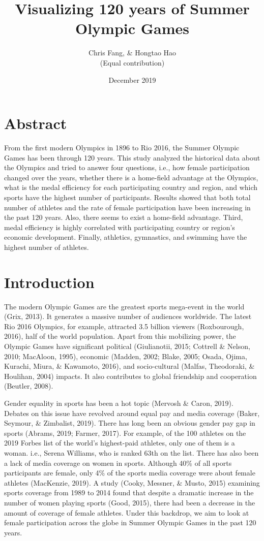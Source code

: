 \documentclass[12pt]{article}
\title{Visualizing 120 years of Summer Olympic Games}
\author{Chris Fang, \& Hongtao Hao \\ (Equal contribution)}
\date{December 2019}
\begin{document}
\section*{Abstract}
From the first modern Olympics in 1896 to Rio 2016, the Summer Olympic Games has been through 120 years. This study analyzed the historical data about the Olympics and tried to answer four questions, i.e., how female participation changed over the years, whether there is a home-field advantage at the Olympics, what is the medal efficiency for each participating country and region, and which sports have the highest number of participants. Results showed that both total number of athletes and the rate of female participation have been increasing in the past 120 years. Also, there seems to exist a home-field advantage. Third, medal efficiency is highly correlated with participating country or region's economic development. Finally, athletics, gymnastics, and swimming have the highest number of athletes.
\newpage
\tableofcontents
\maketitle

\maketitle

\section{Introduction}
\flushleft
The modern Olympic Games are the greatest sports mega-event in the world (Grix, 2013). It generates a massive number of  audiences worldwide. The latest Rio 2016 Olympics, for example, attracted 3.5 billion viewers (Roxbourough, 2016), half of the world population. Apart from this mobilizing power, the Olympic Games have significant political (Giulianotii, 2015; Cottrell \& Nelson, 2010; MacAloon, 1995), economic (Madden, 2002; Blake, 2005; Osada, Ojima, Kurachi, Miura, \& Kawamoto, 2016), and socio-cultural (Malfas, Theodoraki, \& Houlihan, 2004) impacts. It also contributes to global friendship and cooperation (Beutler, 2008). 

Gender equality in sports has been a hot topic (Mervosh \& Caron, 2019). Debates on this issue have revolved around equal pay and media coverage (Baker, Seymour, \& Zimbalist, 2019). There has long been an obvious gender pay gap in sports (Abrams, 2019; Farmer, 2017). For example, of the 100 athletes on the 2019 Forbes list of the world’s highest-paid athletes, only one of them is a woman. i.e., Serena Williams, who is ranked 63th on the list. There has also been a lack of media coverage on women in sports. Although 40\% of all sports participants are female, only 4\% of the sports media coverage were about female athletes (MacKenzie, 2019). A study (Cooky, Messner, \& Musto, 2015) examining sports coverage from 1989 to 2014 found that despite a dramatic increase in the number of women playing sports (Good, 2015), there had been a decrease in the amount of coverage of female athletes. Under this backdrop, we aim to look at female participation across the globe in Summer Olympic Games in the past 120 years.
\end{document}
